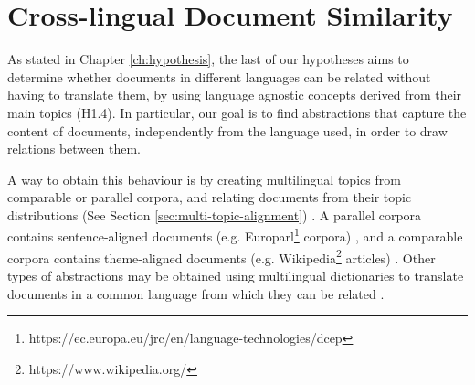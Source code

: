

\chapter{Cross-lingual Document Similarity}\label{ch:multilinguality}

\graphicspath{{multilinguality/figures/}}



As stated in Chapter \ref{ch:hypothesis}, the last of our hypotheses aims to determine whether documents in different languages can be related without having to translate them, by using language agnostic concepts derived from their main topics (H1.4). In particular, our goal is to find abstractions that capture the content of documents, independently from the language used, in order to draw relations between them. 

A way to obtain this behaviour is by creating multilingual topics from comparable or parallel corpora, and relating documents from their topic distributions (See Section \ref{sec:multi-topic-alignment}) \citep{Graber2009, Boyd-Graber2010, Vulic2015}. A parallel corpora contains sentence-aligned documents (e.g. Europarl\footnote{https://ec.europa.eu/jrc/en/language-technologies/dcep} corpora) \citep{Steinberger2014}, and a comparable corpora contains theme-aligned documents (e.g. Wikipedia\footnote{https://www.wikipedia.org/} articles) \citep{Ni2009, Ni:2011:CLT:1935826.1935887}. Other types of abstractions may be obtained using multilingual dictionaries to translate documents in a common language from which they can be related \citep{errez2016, Liu2015a, Ma2017}. 


